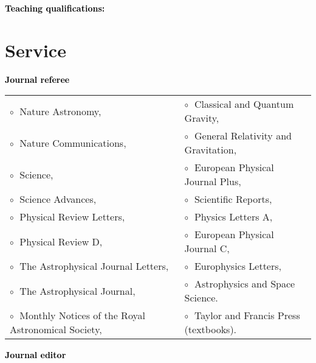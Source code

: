 \vspace{0.2cm}
\textbf{\textcolor{black}{Teaching qualifications:}}\vspace{0.05cm}\\



\newpage

\section{Service}




\textbf{\textcolor{black}{Journal referee}}\vspace{0.1cm}\\
\begin{tabular}{@{\hskip 0.4cm}l@{\hskip 0.4in}l}
$\circ\;$ Nature Astronomy,  & $\circ\;$  Classical and Quantum Gravity,   \\
$\circ\;$ Nature Communications,  & $\circ\;$   General Relativity and Gravitation,  \\
$\circ\;$ Science, & $\circ\;$  European Physical Journal Plus,  \\
$\circ\;$ Science Advances, & $\circ\;$ Scientific Reports, \\
$\circ\;$ Physical Review Letters, & $\circ\;$ Physics Letters A, \\
$\circ\;$ Physical Review D,  & $\circ\;$ European Physical Journal C,  \\
$\circ\;$  The Astrophysical Journal Letters,  &  $\circ\;$  Europhysics Letters, \\
$\circ\;$ The Astrophysical Journal,  &  $\circ\;$ Astrophysics and Space Science. \\
$\circ\;$  Monthly Notices of the Royal Astronomical Society, & $\circ\;$ Taylor and Francis Press (textbooks). \\
\end{tabular}
\vspace{0.2cm}

 \textbf{\textcolor{black}{Journal editor}}\vspace{0.1cm}\\
 \vspace{-0.1cm}
\vspace{0.2cm}


